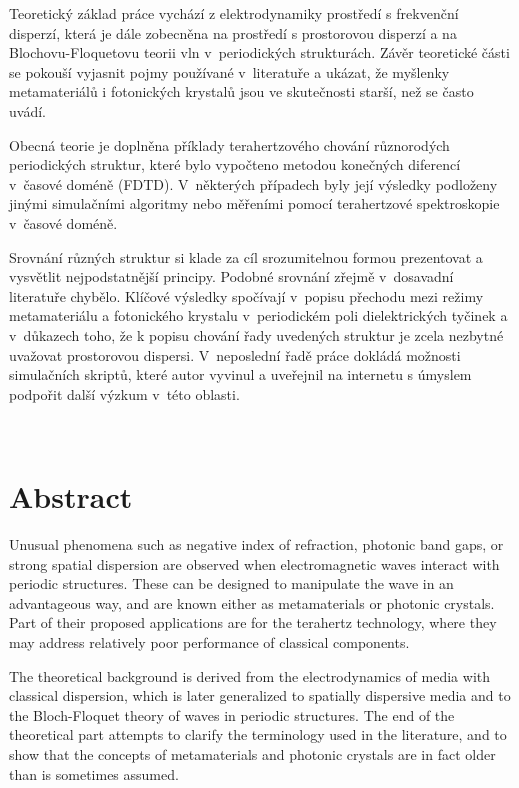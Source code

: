 Teoretický základ práce vychází z elektrodynamiky prostředí s frek\-ven\-ční dis\-per\-zí, která je dále zobecněna na prostředí s prostorovou disperzí a na Blochovu-Floquetovu teorii vln v~periodických strukturách. Závěr teoretické části se pokouší vyjasnit pojmy používané v~literatuře a ukázat, že myšlenky metamateriálů i fotonických krystalů jsou ve skutečnosti starší, než se často uvádí.

Obecná teorie je doplněna příklady terahertzového chování různorodých periodických struktur, které bylo vypočteno metodou konečných diferencí v~časové doméně (FDTD). V~některých případech byly její výsledky podloženy jinými simulačními algoritmy nebo měřeními pomocí terahertzové spektroskopie v~časové doméně.

Srovnání  různých struktur si klade za cíl srozumitelnou formou prezentovat a vy\-svět\-lit nej\-pod\-stat\-něj\-ší principy. Podobné srov\-nání zřejmě v~dosavadní literatuře chy\-bě\-lo. Klíčové vý\-sledky spočí\-vají v~popisu přechodu mezi režimy metamateriálu a fotonického krystalu v~periodickém poli dielektrických tyčinek a v~důkazech toho, že k popisu chování řady uvedených struktur je zcela nezbytné uvažovat prostorovou dispersi. V~neposlední řadě práce dokládá možnosti simulačních skriptů, které autor vyvinul a uveřejnil na internetu s úmyslem podpořit další výzkum v~této oblasti. 

\vspace{0mm}

\thispagestyle{empty} \newpage ~ \thispagestyle{empty} \newpage \setcounter{page}{1}

{\let\clearpage\relax\chapter*{Abstract}}
\noindent
Unusual phenomena such as negative index of refraction, photonic band gaps, or strong spatial dispersion are observed when electromagnetic waves interact with periodic structures. These can be designed to manipulate the wave in an advantageous way, and are known either as metamaterials or photonic crystals. Part of their proposed applications are for the terahertz technology, where they may address relatively poor performance of classical components.

The theoretical background is derived from the electrodynamics of media with classical dispersion, which is later generalized to spatially dispersive media and to the Bloch-Floquet theory of waves in periodic structures. The end of the theoretical part attempts to clarify the terminology used in the literature, and to show that the concepts of metamaterials and photonic crystals are in fact older than is sometimes assumed.

